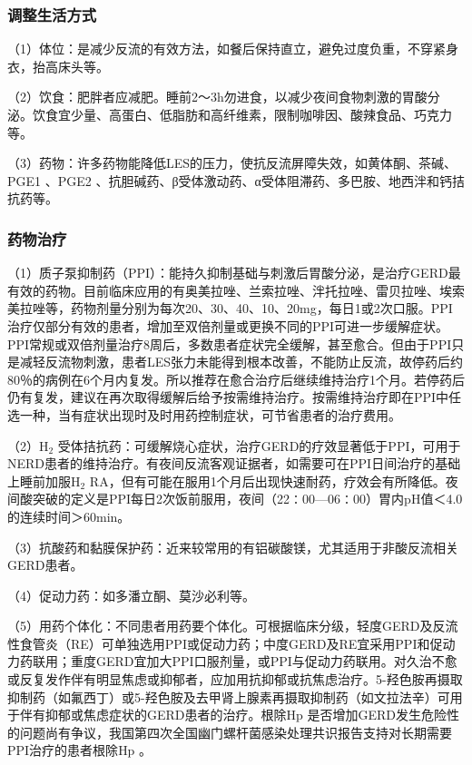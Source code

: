 \subsubsection{调整生活方式}

（1）体位：是减少反流的有效方法，如餐后保持直立，避免过度负重，不穿紧身衣，抬高床头等。

（2）饮食：肥胖者应减肥。睡前2～3h勿进食，以减少夜间食物刺激的胃酸分泌。饮食宜少量、高蛋白、低脂肪和高纤维素，限制咖啡因、酸辣食品、巧克力等。

（3）药物：许多药物能降低LES的压力，使抗反流屏障失效，如黄体酮、茶碱、PGE{1}
、PGE{2}
、抗胆碱药、β受体激动药、α受体阻滞药、多巴胺、地西泮和钙拮抗药等。

\subsubsection{药物治疗}

（1）质子泵抑制药（PPI）：能持久抑制基础与刺激后胃酸分泌，是治疗GERD最有效的药物。目前临床应用的有奥美拉唑、兰索拉唑、泮托拉唑、雷贝拉唑、埃索美拉唑等，药物剂量分别为每次20、30、40、10、20mg，每日1或2次口服。PPI治疗仅部分有效的患者，增加至双倍剂量或更换不同的PPI可进一步缓解症状。PPI常规或双倍剂量治疗8周后，多数患者症状完全缓解，甚至愈合。但由于PPI只是减轻反流物刺激，患者LES张力未能得到根本改善，不能防止反流，故停药后约80％的病例在6个月内复发。所以推荐在愈合治疗后继续维持治疗1个月。若停药后仍有复发，建议在再次取得缓解后给予按需维持治疗。按需维持治疗即在PPI中任选一种，当有症状出现时及时用药控制症状，可节省患者的治疗费用。

（2）H$_2$
受体拮抗药：可缓解烧心症状，治疗GERD的疗效显著低于PPI，可用于NERD患者的维持治疗。有夜间反流客观证据者，如需要可在PPI日间治疗的基础上睡前加服H$_2$
RA，但有可能在服用1个月后出现快速耐药，疗效会有所降低。夜间酸突破的定义是PPI每日2次饭前服用，夜间（22∶00---06∶00）胃内pH值＜4.0的连续时间＞60min。

（3）抗酸药和黏膜保护药：近来较常用的有铝碳酸镁，尤其适用于非酸反流相关GERD患者。

（4）促动力药：如多潘立酮、莫沙必利等。

（5）用药个体化：不同患者用药要个体化。可根据临床分级，轻度GERD及反流性食管炎（RE）可单独选用PPI或促动力药；中度GERD及RE宜采用PPI和促动力药联用；重度GERD宜加大PPI口服剂量，或PPI与促动力药联用。对久治不愈或反复发作伴有明显焦虑或抑郁者，应加用抗抑郁或抗焦虑治疗。5-羟色胺再摄取抑制药（如氟西丁）或5-羟色胺及去甲肾上腺素再摄取抑制药（如文拉法辛）可用于伴有抑郁或焦虑症状的GERD患者的治疗。根除{Hp}
是否增加GERD发生危险性的问题尚有争议，我国第四次全国幽门螺杆菌感染处理共识报告支持对长期需要PPI治疗的患者根除{Hp}
。

